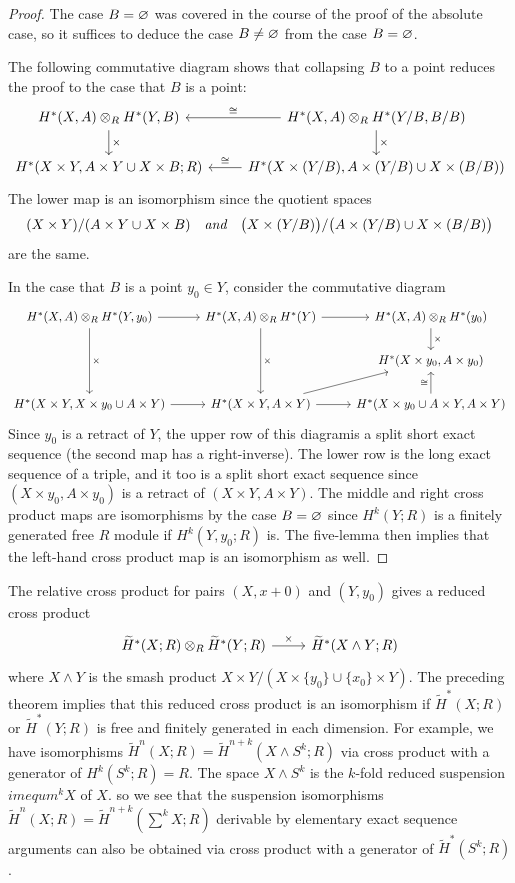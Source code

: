 \begin{proof}
The case $B=\varnothing$ was covered in the course of the proof of the absolute case, so it suffices to deduce the case $B\neq\varnothing$ from the case $B=\varnothing$.\par 
The following commutative diagram shows that collapsing $B$ to a point reduces
the proof to the case that $B$ is a point:
\[\begin{tikzcd}
H^*(X,A)\otimes_RH^*(Y,B)\ar[d,"\times"]&H^*(X,A)\otimes_RH^*(Y/B,B/B)\ar[l,swap,"\cong"]\ar[d,"\times"]\\
H^*(X\times Y,A\times Y\cup X\times B;R)&H^*(X\times(Y/B),A\times(Y/B)\cup X\times(B/B))\ar[l,swap,"\cong"]
\end{tikzcd}\]
The lower map is an isomorphism since the quotient spaces 
\[(X\times Y)/(A\times Y\cup X\times B)\quad\textit{and}\quad\big(X\times(Y/B)\big)/\big(A\times(Y/B)\cup X\times(B/B)\big)\]
are the same.\par
In the case that $B$ is a point $y_0\in Y$, consider the commutative diagram
\[\begin{tikzcd}
H^*(X,A)\otimes_RH^*(Y,y_0)\ar[r]\ar[dd,"\times"]&H^*(X,A)\otimes_RH^*(Y)\ar[r]\ar[dd,"\times"]&H^*(X,A)\otimes_RH^*(y_0)\ar[d,"\times"]\\
&&H^*(X\times y_0,A\times y_0)\\
H^*(X\times Y,X\times y_0\cup A\times Y)\ar[r]&H^*(X\times Y,A\times Y)\ar[r]\ar[ru]&H^*(X\times y_0\cup A\times Y,A\times Y)\ar[u,"\cong"]
\end{tikzcd}\]
Since $y_0$ is a retract of $Y$, the upper row of this diagramis a split short exact sequence (the second map has a right-inverse). The lower row is the long exact sequence of a triple, and it too is a split short exact sequence since $(X\times y_0,A\times y_0)$ is a retract of $(X\times Y,A\times Y)$. The middle and right cross product maps are isomorphisms by the case $B=\varnothing$ since $H^k(Y;R)$ is a finitely generated free $R$ module if $H^k(Y,y_0;R)$ is. The five-lemma then implies that the left-hand cross product map is an isomorphism as well.
\end{proof}
The relative cross product for pairs $(X,x+0)$ and $(Y,y_0)$ gives a reduced cross product
\[\begin{tikzcd}
\widetilde{H}^*(X;R)\otimes_R\widetilde{H}^*(Y;R)\ar[r,"\times"]&\widetilde{H}^*(X\wedge Y;R)
\end{tikzcd}\]
where $X\wedge Y$ is the smash product $X\times Y/(X\times\{y_0\}\cup\{x_0\}\times Y)$. The preceding theorem implies that this reduced cross product is an isomorphism if $\widetilde{H}^*(X;R)$ or $\widetilde{H}^*(Y;R)$ is free and finitely generated in each dimension. For example, we have isomorphisms $\widetilde{H}^n(X;R)=\widetilde{H}^{n+k}(X\wedge S^k;R)$ via cross product with a generator of $H^k(S^k;R)=R$. The space $X\wedge S^k$ is the $k$-fold reduced suspension $imequm^kX$ of $X$. so we see that the suspension isomorphisms $\widetilde{H}^n(X;R)=\widetilde{H}^{n+k}(\sum^kX;R)$ derivable by elementary exact sequence arguments can also be obtained via cross product with a generator of $\widetilde{H}^*(S^k;R)$.
